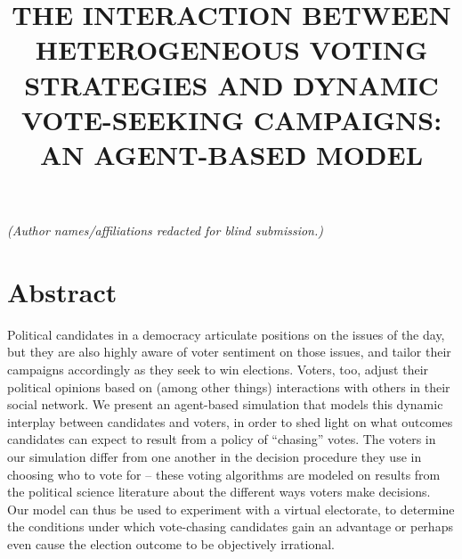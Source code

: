 \documentclass{scspaperproc}
\begin{document}
\SCSpagesetup{\phantom{Davies and Peura}}

\def\SCSconferencename{Annual Simulation Conference}

\def\SCSconferenceacro{ANNSIM'24}

\def\SCSpublicationyear{2024}

\def\SCSconferenceeditors{P.J. Giabbanelli, I. David, C. Ruiz-Martin, B. Oakes and R. C\'{a}rdenas}

\def\SCSconferencedates{May 20-23}

\def\SCSconferencevenue{American University, DC, USA}

\title{THE INTERACTION BETWEEN HETEROGENEOUS VOTING STRATEGIES AND DYNAMIC
VOTE-SEEKING CAMPAIGNS: AN AGENT-BASED MODEL}

\textit{(Author names/affiliations redacted for blind submission.)}

\author[\authorrefmark{1}]{\phantom{Stephen Davies}}


%


\maketitle

\section*{Abstract}

Political candidates in a democracy articulate positions on the issues of the
day, but they are also highly aware of voter sentiment on those issues, and
tailor their campaigns accordingly as they seek to win elections. Voters, too,
adjust their political opinions based on (among other things) interactions with
others in their social network. We present an agent-based simulation that
models this dynamic interplay between candidates and voters, in order to shed
light on what outcomes candidates can expect to result from a policy of
``chasing'' votes. The voters in our simulation differ from one another in the
decision procedure they use in choosing who to vote for -- these voting
algorithms are modeled on results from the political science literature about
the different ways voters make decisions. Our model can thus be used to
experiment with a virtual electorate, to determine the conditions under which
vote-chasing candidates gain an advantage or perhaps even cause the election
outcome to be objectively irrational.
\end{document}
